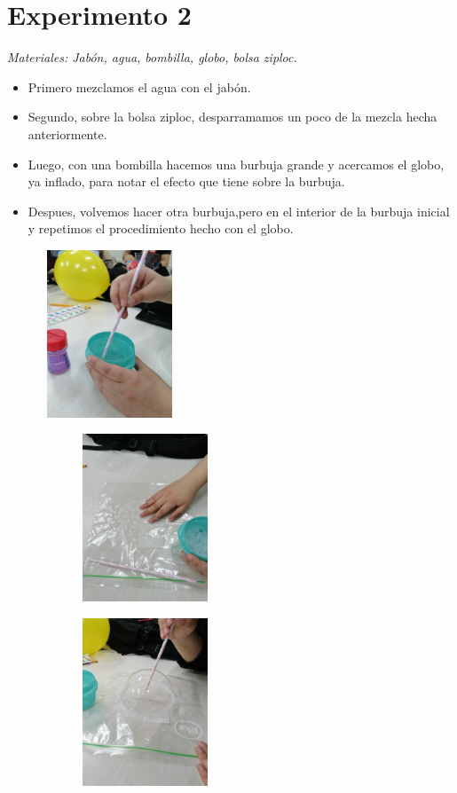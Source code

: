 \documentclass[a4paper,12pt]{article}
\begin{document}
\section*{Experimento 2}
\textit{Materiales: Jabón, agua, bombilla, globo, bolsa ziploc.}
\begin{itemize}
    \item Primero mezclamos el agua con el jabón.
    \item Segundo, sobre la bolsa ziploc, desparramamos un poco de la mezcla hecha anteriormente.
    \item Luego, con una bombilla hacemos una burbuja grande y acercamos el globo, ya inflado, para notar el efecto que tiene sobre la burbuja.
    \item Despues, volvemos hacer otra burbuja,pero en el interior de la burbuja inicial y repetimos el procedimiento hecho con el globo.
\end{itemize}

\begin{figure}[h]
    \begin{subfigure}
        \raggedright
        \includegraphics[width=4cm, height=5cm]{imag/Exp2_00.jpg}
    \end{subfigure}
    \begin{subfigure}
        \centering
        \includegraphics[width=4cm, height=5cm]{imag/Exp2_01.jpg}
    \end{subfigure}
    \begin{subfigure}
        \raggedleft
        \includegraphics[width=4cm, height=5cm]{imag/Exp2_02.jpg}
    \end{subfigure}
\end{figure}
\end{document}
